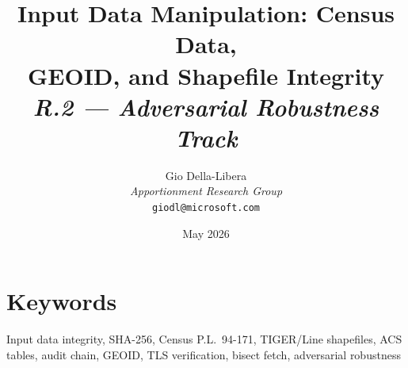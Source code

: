 \documentclass[12pt]{article}
\title{%
  \textbf{Input Data Manipulation: Census Data,\\
  GEOID, and Shapefile Integrity}\\[0.8em]
  \normalsize\textit{R.2 --- Adversarial Robustness Track}%
}
\author{%
  Gio Della-Libera\\
  \textit{Apportionment Research Group}\\
  \small\texttt{giodl@microsoft.com}
}
\date{May 2026}
\begin{document}
\maketitle

\begin{abstract}

\end{abstract}

\section*{Keywords}
Input data integrity, SHA-256, Census P.L.\ 94-171, TIGER/Line shapefiles,
ACS tables, audit chain, GEOID, TLS verification, bisect fetch, adversarial robustness

\tableofcontents
\newpage













\end{document}
